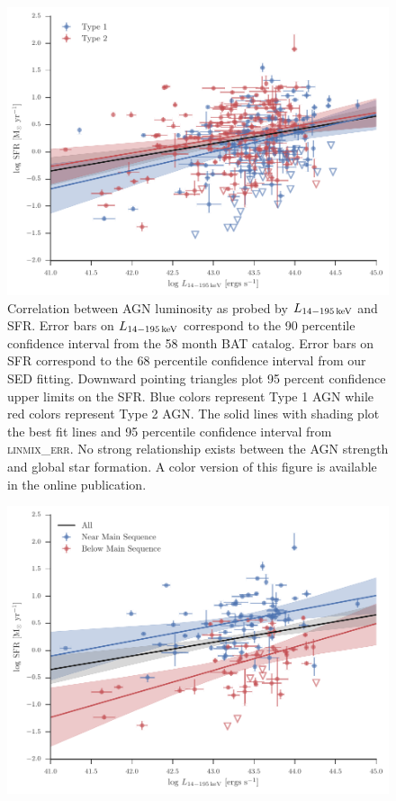\documentclass[fleqn, usenatbib]{mnras}
\begin{document}
\begin{figure}
\includegraphics{figures/sfr_lbat_correlation}
\caption{Correlation between AGN luminosity as probed by $L_{\rm 14-195\,keV}$ and SFR. Error bars on $L_{\rm14-195\,keV}$ correspond to the 90 percentile confidence interval from the 58 month BAT catalog. Error bars on SFR correspond to the 68 percentile confidence interval from our SED fitting. Downward pointing triangles plot 95 percent confidence upper limits on the SFR. Blue colors represent Type 1 AGN while red colors represent Type 2 AGN. The solid lines with shading plot the best fit lines and 95 percentile confidence interval from \textsc{linmix\_err}. No strong relationship exists between the AGN strength and global star formation. A color version of this figure is available in the online publication.\label{fig:sfr_lbat_correlation}}
\end{figure}

\begin{figure}
\includegraphics{figures/sfr_lbat_correlation_split_main_seqeunce}
\caption{\label{fig:sfr_lbat_correlation_ms}}
\end{figure}
\end{document}
